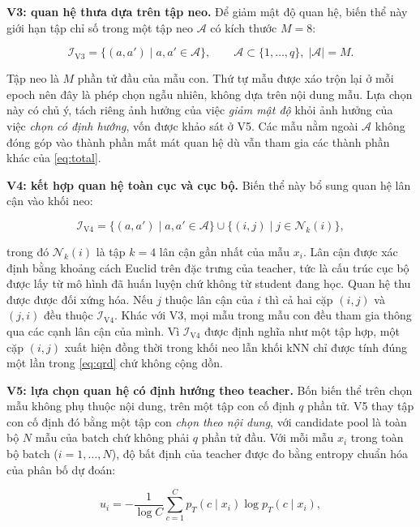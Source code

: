 \textbf{V3: quan hệ thưa dựa trên tập neo.} Để giảm mật độ quan hệ, biến thể
này giới hạn tập chỉ số trong một tập neo $\mathcal{A}$ có kích thước
$M = 8$:

\begin{equation}
\label{eq:i-v3}
\mathcal{I}_{\mathrm{V3}} = \{(a,a') \mid a, a' \in \mathcal{A}\},
\qquad \mathcal{A} \subset \{1,\ldots,q\}, \; |\mathcal{A}| = M.
\end{equation}

Tập neo là $M$ phần tử đầu của mẫu con. Thứ tự mẫu được xáo trộn lại ở
mỗi epoch nên đây là phép chọn ngẫu nhiên, không dựa trên nội dung mẫu. Lựa
chọn này có chủ ý, tách riêng ảnh hưởng của việc \emph{giảm mật độ} khỏi
ảnh hưởng của việc \emph{chọn có định hướng}, vốn được khảo sát ở V5. Các mẫu nằm ngoài $\mathcal{A}$ không đóng góp vào thành phần mất mát
quan hệ dù vẫn tham gia các thành phần khác của \eqref{eq:total}.

\textbf{V4: kết hợp quan hệ toàn cục và cục bộ.} Biến thể này bổ sung quan hệ
lân cận vào khối neo:

\begin{equation}
\label{eq:i-v4}
\mathcal{I}_{\mathrm{V4}} = \{(a,a') \mid a,a' \in \mathcal{A}\}
  \cup \{(i,j) \mid j \in \mathcal{N}_k(i)\},
\end{equation}

trong đó $\mathcal{N}_k(i)$ là tập $k = 4$ lân cận gần nhất của mẫu $x_i$.
Lân cận được xác định bằng khoảng cách Euclid trên đặc trưng của teacher, tức
là cấu trúc cục bộ được lấy từ mô hình đã huấn luyện chứ không từ student
đang học. Quan hệ thu được được đối xứng hóa. Nếu $j$ thuộc lân cận của $i$
thì cả hai cặp $(i,j)$ và $(j,i)$ đều thuộc $\mathcal{I}_{\mathrm{V4}}$. Khác
với V3, mọi mẫu trong mẫu con đều tham gia thông qua các cạnh lân cận của
mình. Vì $\mathcal{I}_{\mathrm{V4}}$ được định nghĩa như một tập hợp, một cặp
$(i,j)$ xuất hiện đồng thời trong khối neo lẫn khối kNN chỉ được tính đúng
một lần trong \eqref{eq:qrd} chứ không cộng dồn.

\textbf{V5: lựa chọn quan hệ có định hướng theo teacher.} Bốn biến thể trên
chọn mẫu không phụ thuộc nội dung, trên một tập con cố định $q$ phần tử. V5
thay tập con cố định đó bằng một tập con \emph{chọn theo nội dung}, với
candidate pool là toàn bộ $N$ mẫu của batch chứ không phải $q$ phần tử đầu.
Với mỗi mẫu $x_i$ trong toàn bộ batch ($i = 1,\ldots,N$), độ bất định của
teacher được đo bằng entropy chuẩn hóa của phân bố dự đoán:

\begin{equation}
\label{eq:entropy}
u_i = -\frac{1}{\log C}\sum_{c=1}^{C}
  p_T(c \mid x_i) \log p_T(c \mid x_i),
\end{equation}

